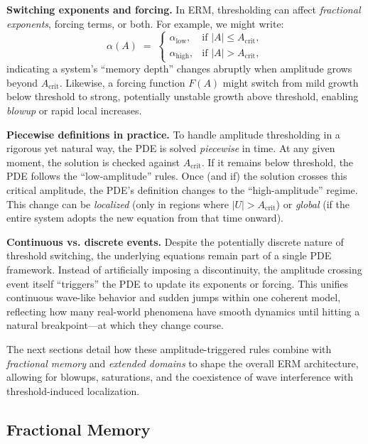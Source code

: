 \documentclass[12pt]{article}
\begin{document}
\medskip

\noindent
\textbf{Switching exponents and forcing.}
In ERM, thresholding can affect \emph{fractional exponents}, forcing terms, or
both. For example, we might write:
\[
\alpha(A) \;=\;
\begin{cases}
\alpha_{\mathrm{low}}, & \text{if } |A| \le A_{\mathrm{crit}},\\[5pt]
\alpha_{\mathrm{high}}, & \text{if } |A| > A_{\mathrm{crit}},
\end{cases}
\]
indicating a system’s “memory depth” changes abruptly when amplitude grows beyond
$A_{\mathrm{crit}}$. Likewise, a forcing function
$F(A)$ might switch from mild growth below threshold to strong, potentially
unstable growth above threshold, enabling \emph{blowup} or rapid local increases.

\medskip

\noindent
\textbf{Piecewise definitions in practice.}
To handle amplitude thresholding in a rigorous yet natural way, the PDE is solved
\emph{piecewise} in time. At any given moment, the solution is checked against
$A_{\mathrm{crit}}$. If it remains below threshold, the PDE follows the
“low-amplitude” rules. Once (and if) the solution crosses this critical amplitude,
the PDE’s definition changes to the “high-amplitude” regime. This change can be
\emph{localized} (only in regions where $|U| > A_{\mathrm{crit}}$) or \emph{global}
(if the entire system adopts the new equation from that time onward).

\medskip

\noindent
\textbf{Continuous vs. discrete events.}
Despite the potentially discrete nature of threshold switching, the underlying
equations remain part of a single PDE framework. Instead of artificially imposing
a discontinuity, the amplitude crossing event itself “triggers” the PDE to update
its exponents or forcing. This unifies continuous wave-like behavior and sudden
jumps within one coherent model, reflecting how many real-world phenomena have
smooth dynamics until hitting a natural breakpoint—at which they change course.

\medskip

\noindent
The next sections detail how these amplitude-triggered rules combine with
\emph{fractional memory} and \emph{extended domains} to shape the overall ERM
architecture, allowing for blowups, saturations, and the coexistence of wave
interference with threshold-induced localization.

\subsection{Fractional Memory}
\label{subsec:fractional_memory}
\end{document}
